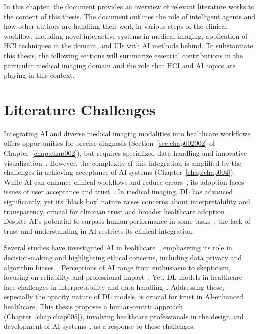 \clearpage
\label{chap:chap003}

In this chapter, the document provides an overview of relevant literature works to the content of this thesis.
The document outlines the role of intelligent agents and how other authors are handling their work in various steps of the clinical workflow, including novel interactive systems in medical imaging, application of \ac{HCI} techniques in the domain, and \acp{UI} with \ac{AI} methods behind.
To substantiate this thesis, the following sections will summarize essential contributions in the particular medical imaging domain and the role that \ac{HCI} and \ac{AI} topics are playing in this context.

\section{Literature Challenges}
\label{sec:chap003001}

\textcolor{revised}{Integrating \ac{AI} and diverse medical imaging modalities into healthcare workflows offers opportunities for precise diagnosis (Section~\ref{sec:chap002002} of Chapter~\ref{chap:chap002}), but requires specialized data handling and innovative visualization~\cite{Igarashi:2016:IVS:2984511.2984537}.
However, the complexity of this integration is amplified by the challenges in achieving acceptance of \ac{AI} systems (Chapter~\ref{chap:chap004}).
While \ac{AI} can enhance clinical workflows and reduce errors~\cite{Cai:2019:EEE:3301275.3302289}, its adoption faces issues of user acceptance and trust~\cite{https://doi.org/10.1002/mp.13562}.
In medical imaging, \ac{DL} has advanced significantly, yet its `black box' nature raises concerns about interpretability and transparency, crucial for clinician trust and broader healthcare adoption~\cite{10.1145/3306618.3314293, gunning2017explainable, 10.1145/3290605.3300233}.
Despite \ac{AI}'s potential to surpass human performance in some tasks~\cite{McKinney2020}, the lack of trust and understanding in \ac{AI} restricts its clinical integration.}

\textcolor{revised}{Several studies have investigated \ac{AI} in healthcare~\cite{LANGER2021106878, PELAU2021106855, STADIN2021106486}, emphasizing its role in decision-making and highlighting ethical concerns, including data privacy and algorithm biases~\cite{PARK2021106795}.
Perceptions of \ac{AI} range from enthusiasm to skepticism, focusing on reliability and professional impact~\cite{10.1145/3311957.3361858}.
Yet, \ac{DL} models in healthcare face challenges in interpretability and data handling~\cite{McKinney2020}.
Addressing these, especially the opacity nature of \ac{DL} models, is crucial for trust in \ac{AI}-enhanced healthcare.
This thesis proposes a human-centric approach (Chapter~\ref{chap:chap005}), involving healthcare professionals in the design and development of \ac{AI} systems~\cite{CALISTO2021102607}, as a response to these challenges.}

